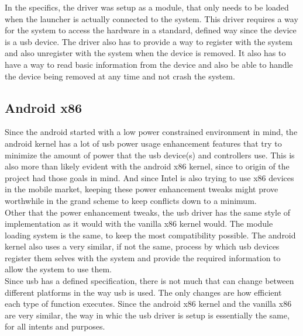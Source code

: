\documentclass[letterpaper,10pt,titlepage]{article}
\begin{document}
In the specifics, the driver was setup as a module, that only needs to be loaded when the launcher is actually connected to the system. This driver requires a way for the system to access the hardware in a standard, defined way since the device is a usb device. The driver also has to provide a way to register with the system and also unregister with the system when the device is removed. It also has to have a way to read basic information from the device and also be able to handle the device being removed at any time and not crash the system.\\

\subsection*{Android x86}

Since the android started with a low power constrained environment in mind, the android kernel has a lot of usb power usage enhancement features that try to minimize the amount of power that the usb device(s) and controllers use. This is also more than likely evident with the android x86 kernel, since to origin of the project had those goals in mind. And since Intel is also trying to use x86 devices in the mobile market, keeping these power enhancement tweaks might prove worthwhile in the grand scheme to keep conflicts down to a minimum.\\

Other that the power enhancement tweaks, the usb driver has the same style of implementation as it would with the vanilla x86 kernel would. The module loading system is the same, to keep the most compatibility possible. The android kernel also uses a very similar, if not the same, process by which usb devices register them selves with the system and provide the required information to allow the system to use them.\\

Since usb has a defined specification, there is not much that can change between different platforms in the way usb is used. The only changes are how efficient each type of function executes. Since the android x86 kernel and the vanilla x86 are very similar, the way in whic the usb driver is setup is essentially the same, for all intents and purposes.
\end{document}
